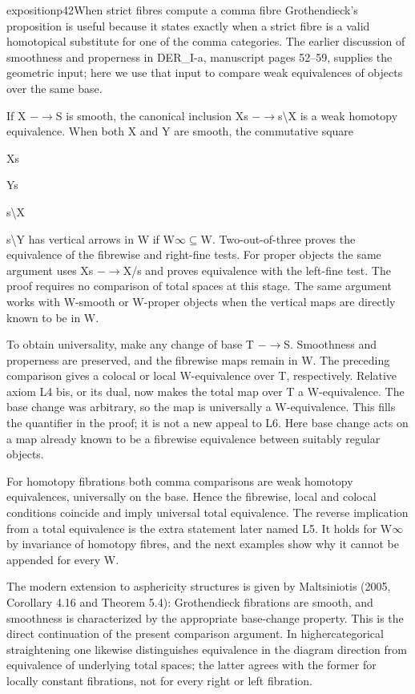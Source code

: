 \begin{dcomment}{exposition}{p42}{When strict fibres compute a comma fibre}
Grothendieck’s proposition is useful because it states exactly when a strict fibre is a valid homotopical substitute for one of the comma categories. The earlier discussion of smoothness and properness in DER\_I-a, manuscript pages 52--59, supplies the geometric input; here we use that input to compare weak equivalences of objects over the same base.

If X \ensuremath{-}\ensuremath{\to}S is smooth, the canonical inclusion Xs \ensuremath{-}\ensuremath{\to}s\textbackslash{}X is a weak homotopy equivalence. When both X and Y are smooth, the commutative square

Xs

Ys

s\textbackslash{}X

s\textbackslash{}Y has vertical arrows in W if W\ensuremath{\infty}\ensuremath{\subseteq}W. Two-out-of-three proves the equivalence of the fibrewise and right-fine tests. For proper objects the same argument uses Xs \ensuremath{-}\ensuremath{\to}X/s and proves equivalence with the left-fine test. The proof requires no comparison of total spaces at this stage. The same argument works with W-smooth or W-proper objects when the vertical maps are directly known to be in W.

To obtain universality, make any change of base T \ensuremath{-}\ensuremath{\to}S. Smoothness and properness are preserved, and the fibrewise maps remain in W. The preceding comparison gives a colocal or local W-equivalence over T, respectively. Relative axiom L4 bis, or its dual, now makes the total map over T a W-equivalence. The base change was arbitrary, so the map is universally a W-equivalence. This fills the quantifier in the proof; it is not a new appeal to L6. Here base change acts on a map already known to be a fibrewise equivalence between suitably regular objects.

For homotopy fibrations both comma comparisons are weak homotopy equivalences, universally on the base. Hence the fibrewise, local and colocal conditions coincide and imply universal total equivalence. The reverse implication from a total equivalence is the extra statement later named L5. It holds for W\ensuremath{\infty} by invariance of homotopy fibres, and the next examples show why it cannot be appended for every W.

The modern extension to asphericity structures is given by Maltsiniotis (2005, Corollary 4.16 and Theorem 5.4): Grothendieck fibrations are smooth, and smoothness is characterized by the appropriate base-change property. This is the direct continuation of the present comparison argument. In highercategorical straightening one likewise distinguishes equivalence in the diagram direction from equivalence of underlying total spaces; the latter agrees with the former for locally constant fibrations, not for every right or left fibration.

\end{dcomment}

